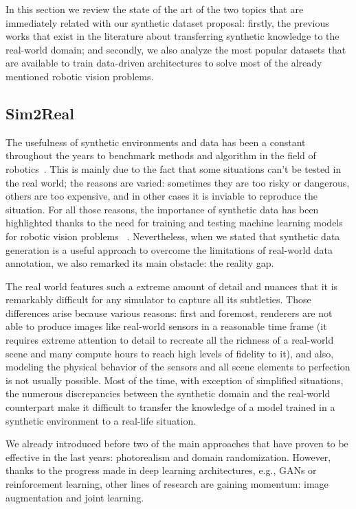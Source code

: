 In this section we review the state of the art of the two topics that are immediately related with our synthetic dataset proposal: firstly, the previous works that exist in the literature about transferring synthetic knowledge to the real-world domain; and secondly, we also analyze the most popular datasets that are available to train data-driven architectures to solve most of the already mentioned robotic vision problems.

\subsection{Sim2Real}

The usefulness of synthetic environments and data has been a constant throughout the years to benchmark methods and algorithm in the field of robotics~\cite{Butler2012}. This is mainly due to the fact that some situations can't be tested in the real world; the reasons are varied: sometimes they are too risky or dangerous, others are too expensive, and in other cases it is inviable to reproduce the situation. For all those reasons, the importance of synthetic data has been highlighted thanks to the need for training and testing machine learning models for robotic vision problems~ \cite{Brodeur2017} \cite{Ros2016} \cite{Mahler2017dex}. Nevertheless, when we stated that synthetic data generation is a useful approach to overcome the limitations of real-world data annotation, we also remarked its main obstacle: the reality gap.

The real world features such a extreme amount of detail and nuances that it is remarkably difficult for any simulator to capture all its subtleties. Those differences arise because various reasons: first and foremost, renderers are not able to produce images like real-world sensors in a reasonable time frame (it requires extreme attention to detail to recreate all the richness of a real-world scene and many compute hours to reach high levels of fidelity to it), and also, modeling the physical behavior of the sensors and all scene elements to perfection is not usually possible. Most of the time, with exception of simplified situations, the numerous discrepancies between the synthetic domain and the real-world counterpart make it difficult to transfer the knowledge of a model trained in a synthetic environment to a real-life situation.

We already introduced before two of the main approaches that have proven to be effective in the last years: photorealism and domain randomization. However, thanks to the progress made in deep learning architectures, e.g., \acp{GAN} or reinforcement learning, other lines of research are gaining momentum: image augmentation and joint learning.

